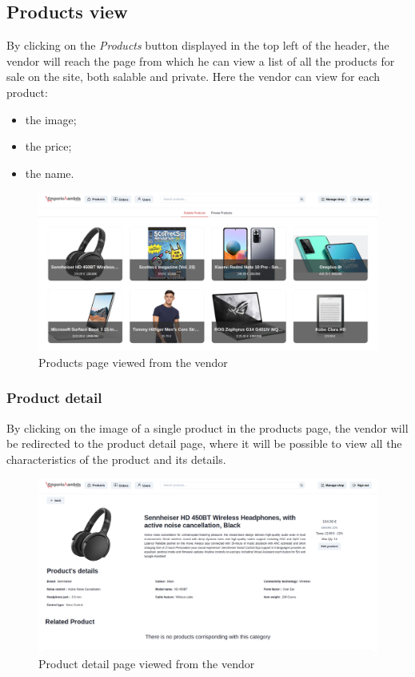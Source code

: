 \subsection{Products view}
By clicking on the \textit{Products} button displayed in the top left of the header, the vendor will reach the page from which he can view a list of all the products for sale on the site, both salable and private.
Here the vendor can view for each product:
\begin {itemize}
\item the image;
\item the price;
\item the name.
\end {itemize}
\begin{figure}[!ht]
    \caption{Products page viewed from the vendor}
    \vspace{5px}
    \includegraphics[scale=0.25]{../../../../Images/userManual/productsVendor.png}
    \centering
\end{figure}
\pagebreak
\subsubsection{Product detail}
By clicking on the image of a single product in the products page, the vendor will be redirected to the product detail page, where it will be possible to view all the characteristics of the product and its details.
\begin{figure}[!ht]
    \caption{Product detail page viewed from the vendor}
    \vspace{5px}
    \includegraphics[scale=0.25]{../../../../Images/userManual/productDetailVendor.png}
    \centering
\end{figure}
\pagebreak
